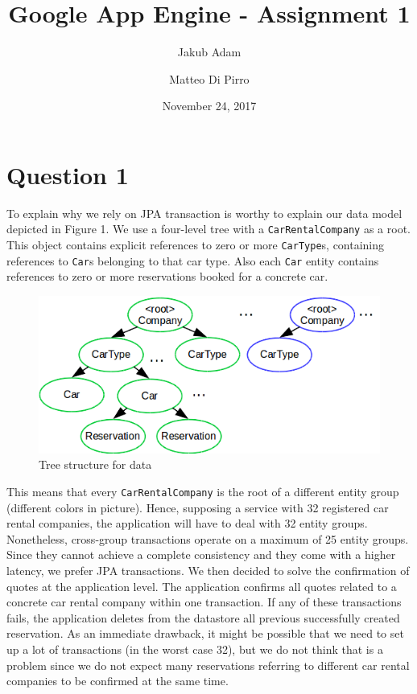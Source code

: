 \documentclass[a4paper,10pt]{article}
\begin{document}
	
\title{Google App Engine - Assignment 1}
\author{Jakub Adam \and Matteo Di Pirro}
\date{November 24, 2017}

\maketitle

\section{Question 1}
To explain why we rely on JPA transaction is worthy to explain our data model depicted in Figure 1. We use a four-level tree with a \texttt{CarRentalCompany} as a root. This object contains explicit references to zero or more \texttt{CarType}s, containing references to \texttt{Car}s belonging to that car type. Also each \texttt{Car} entity contains references to zero or more reservations booked for a concrete car.

\begin{figure}[h]
	\centering
	\includegraphics[scale=0.8]{./TreeStructure}
	\caption{Tree structure for data}
\end{figure}

This means that every \texttt{CarRentalCompany} is the root of a different entity group (different colors in picture). Hence, supposing a service with 32 registered car rental companies, the application will have to deal with 32 entity groups. Nonetheless, cross-group transactions operate on a maximum of 25 entity groups. Since they cannot achieve a complete consistency and they come with a higher latency, we prefer JPA transactions. We then decided to solve the confirmation of quotes at the application level. The application confirms all quotes related to a concrete car rental company within one transaction. If any of these transactions fails, the application deletes from the datastore all previous successfully created reservation. As an immediate drawback, it might be possible that we need to set up a lot of transactions (in the worst case 32), but we do not think that is a problem since we do not expect many reservations referring to different car rental companies to be confirmed at the same time.
\end{document}
